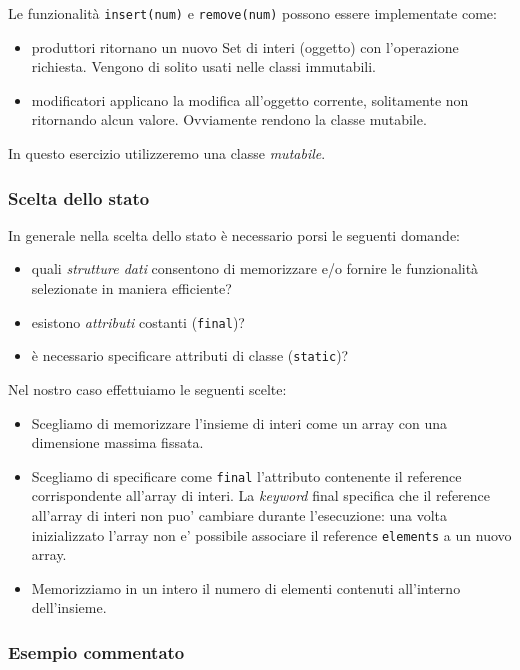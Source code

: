 \documentclass{article}
\begin{document}
Le funzionalit\`a \texttt{insert(num)} e \texttt{remove(num)} possono essere implementate come:
\begin{itemize}
	\item produttori ritornano un nuovo Set di interi (oggetto) con l'operazione richiesta. Vengono di solito usati nelle classi immutabili.
	\item modificatori applicano la modifica all'oggetto corrente, solitamente non ritornando alcun valore. Ovviamente rendono la classe mutabile.
\end{itemize}
In questo esercizio utilizzeremo una classe \emph{mutabile}.

\subsubsection{Scelta dello stato}
In generale nella scelta dello stato \`e necessario porsi le seguenti domande:
\begin{itemize}
\item quali \emph{strutture dati} consentono di memorizzare e/o fornire le funzionalit\`a selezionate in maniera efficiente?
\item esistono \emph{attributi} costanti (\texttt{final})?
\item \`e necessario specificare attributi di classe (\texttt{static})?
\end{itemize}

Nel nostro caso effettuiamo le seguenti scelte:
\begin{itemize}
\item Scegliamo di memorizzare l'insieme di interi come un array con una dimensione massima fissata.
\item Scegliamo di specificare come \texttt{final} l'attributo contenente il reference corrispondente all'array di interi. La \textit{keyword} final specifica che il reference all'array di interi non puo' cambiare durante l'esecuzione: una volta inizializzato l'array non e' possibile associare il reference \texttt{elements} a un nuovo array.
\item Memorizziamo in un intero il numero di elementi contenuti all'interno dell'insieme.
\end{itemize}


\subsubsection{Esempio commentato}

\end{document}
